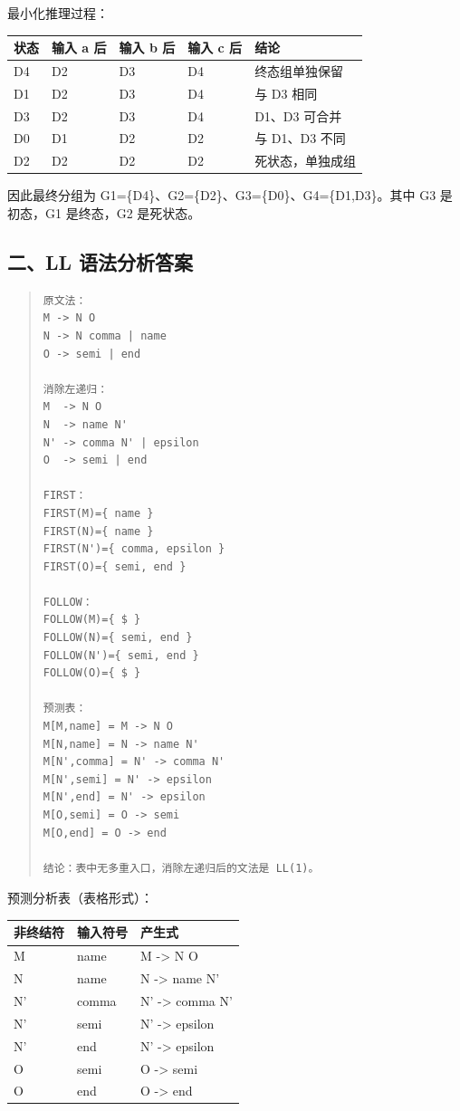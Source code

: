 \documentclass[UTF8,zihao=-4]{ctexart}
\begin{document}
最小化推理过程：

\begin{center}
\footnotesize
\begin{tabular}{lllll}
\hline
状态 & 输入 a 后 & 输入 b 后 & 输入 c 后 & 结论 \\
\hline
D4 & D2 & D3 & D4 & 终态组单独保留 \\
D1 & D2 & D3 & D4 & 与 D3 相同 \\
D3 & D2 & D3 & D4 & D1、D3 可合并 \\
D0 & D1 & D2 & D2 & 与 D1、D3 不同 \\
D2 & D2 & D2 & D2 & 死状态，单独成组 \\
\hline
\end{tabular}
\end{center}

因此最终分组为 G1=\{D4\}、G2=\{D2\}、G3=\{D0\}、G4=\{D1,D3\}。其中 G3 是初态，G1 是终态，G2 是死状态。



\subsection{二、LL 语法分析答案}


\begin{quote}
\footnotesize
\begin{verbatim}
原文法：
M -> N O
N -> N comma | name
O -> semi | end

消除左递归：
M  -> N O
N  -> name N'
N' -> comma N' | epsilon
O  -> semi | end

FIRST：
FIRST(M)={ name }
FIRST(N)={ name }
FIRST(N')={ comma, epsilon }
FIRST(O)={ semi, end }

FOLLOW：
FOLLOW(M)={ $ }
FOLLOW(N)={ semi, end }
FOLLOW(N')={ semi, end }
FOLLOW(O)={ $ }

预测表：
M[M,name] = M -> N O
M[N,name] = N -> name N'
M[N',comma] = N' -> comma N'
M[N',semi] = N' -> epsilon
M[N',end] = N' -> epsilon
M[O,semi] = O -> semi
M[O,end] = O -> end

结论：表中无多重入口，消除左递归后的文法是 LL(1)。
\end{verbatim}
\end{quote}

预测分析表（表格形式）：

\begin{center}
\footnotesize
\begin{tabular}{lll}
\hline
非终结符 & 输入符号 & 产生式 \\
\hline
M & name & M -> N O \\
N & name & N -> name N' \\
N' & comma & N' -> comma N' \\
N' & semi & N' -> epsilon \\
N' & end & N' -> epsilon \\
O & semi & O -> semi \\
O & end & O -> end \\
\hline
\end{tabular}
\end{center}
\end{document}
